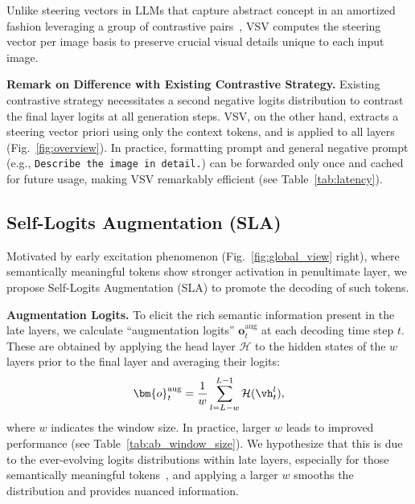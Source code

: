 \documentclass{article}
\theoremstyle{plain}
\theoremstyle{definition}
\theoremstyle{remark}
\begin{document}
Unlike steering vectors in LLMs that capture abstract concept in an amortized fashion leveraging a group of contrastive pairs~\cite{zou2023representation}, VSV computes the steering vector per image basis to preserve crucial visual details unique to each input image.

\textbf{Remark on Difference with Existing Contrastive Strategy.}
Existing contrastive strategy \cite{li2022contrastive, vcd} necessitates a second negative logits distribution to contrast the final layer logits at all generation steps. VSV, on the other hand, extracts a steering vector priori using only the context tokens, and is applied to all layers (Fig.~\ref{fig:overview}). In practice, formatting prompt and general negative prompt (e.g., \texttt{Describe the image in detail.}) can be forwarded only once and cached for future usage, making VSV remarkably efficient (see Table~\ref{tab:latency}).

\subsection{Self-Logits Augmentation (SLA)}
\label{sec:method-sla}
Motivated by early excitation phenomenon (Fig.~\ref{fig:global_view} right), where semantically meaningful tokens show stronger activation in penultimate layer, we propose Self-Logits Augmentation (SLA) to promote the decoding of such tokens.

\textbf{Augmentation Logits.}
To elicit the rich semantic information present in the late layers, we calculate ``augmentation logits'' $\bm{o}_t^{\text{aug}}$ at each decoding time step $t$.
These are obtained by applying the head layer $\mathcal{H}$ to the hidden states of the $w$ layers prior to the final layer and averaging their logits:
\begin{equation} 
\bm{o}_t^{\text{aug}} = \frac{1}{w} \sum_{l = L - w}^{L-1} \mathcal{H}(\vh_t^l),
\end{equation}
where $w$ indicates the window size. In practice, larger $w$ leads to improved performance (see Table~\ref{tab:ab_window_size}). We hypothesize that this is due to the ever-evolving logits distributions within late layers, especially for those semantically meaningful tokens~\cite{dola}, and applying a larger $w$ smooths the distribution and provides nuanced information. 
\end{document}

